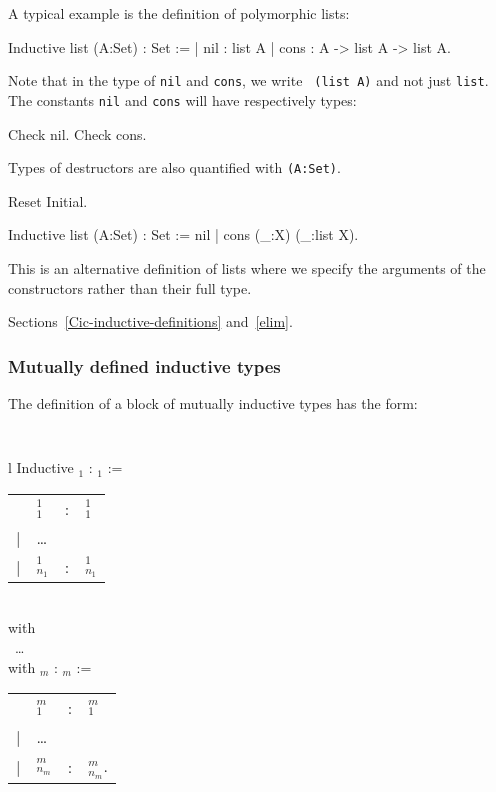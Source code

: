 A typical example is the definition of polymorphic lists:
\begin{coq_example*}
Inductive list (A:Set) : Set :=
  | nil : list A
  | cons : A -> list A -> list A.
\end{coq_example*}

Note that in the type of {\tt nil} and {\tt cons}, we write {\tt
  (list A)} and not just {\tt list}.\\ The constants {\tt nil} and
{\tt cons} will have respectively types:

\begin{coq_example}
Check nil.
Check cons.
\end{coq_example}

Types of destructors are also quantified with {\tt (A:Set)}.

\begin{coq_eval}
Reset Initial.
\end{coq_eval}
\begin{Variants}
\item
\begin{coq_example*}
Inductive list (A:Set) : Set := nil | cons (_:X) (_:list X).
\end{coq_example*}
This is an alternative definition of lists where we specify the
arguments of the constructors rather than their full type.
\end{Variants}

\begin{ErrMsgs}
\item {}
\end{ErrMsgs}

\SeeAlso Sections~\ref{Cic-inductive-definitions} and~\ref{elim}.


\subsubsection{Mutually defined inductive types
\label{Mutual-Inductive}}

The definition of a block of mutually inductive types has the form:

\medskip
{\tt 
\begin{tabular}{l}
Inductive {\ident$_1$} : {\type$_1$} :=  \\
\begin{tabular}{clcl}
   & {\ident$_1^1$}     &:& {\type$_1^1$} \\
 | & {\ldots} && \\
 | & {\ident$_{n_1}^1$} &:& {\type$_{n_1}^1$}
\end{tabular}  \\
with\\
~{\ldots} \\
with {\ident$_m$} : {\type$_m$} := \\
\begin{tabular}{clcl}
   & {\ident$_1^m$}     &:& {\type$_1^m$} \\
 | & {\ldots} \\
 | & {\ident$_{n_m}^m$} &:& {\type$_{n_m}^m$}.
\end{tabular}
\end{tabular}
}
\medskip

